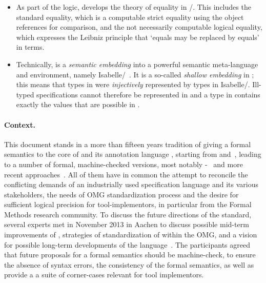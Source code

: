\begin{itemize}
 \item As part of the \OCL logic,  \FOCL develops the theory of
         equality in \UML/\OCL. This includes the standard equality, which is a
         computable strict equality using the object references for comparison,
         and the not necessarily computable logical equality, which expresses
         the Leibniz principle that `equals may be replaced by equals' in 
         \OCL terms.
 \item Technically,  \FOCL is a \emph{semantic embedding} into a 
         powerful semantic meta-language and
         environment, namely Isabelle/\HOL~\cite{nipkow.ea:isabelle:2002}.
         It is a so-called \emph{shallow embedding} in \HOL; this means that types
         in \OCL were \emph{injectively} represented by types in Isabelle/\HOL. 
         Ill-typed \OCL specifications cannot therefore be represented in
          \FOCL and a type in  \FOCL contains exactly
         the values that are possible in \OCL\@. 
\end{itemize}

\paragraph{Context.} This document stands in a more than fifteen years
tradition of giving a formal semantics to the core of \UML and its
annotation language \OCL, starting from \citet{richters:precise:2002}
and~\cite{hamie.ea:reflections:1998,mandel.ea:ocl:1999,cook.ea::amsterdam:2002},
leading to a number of formal, machine-checked versions, most notably
\HOL-\OCL~\cite{brucker.ea:semantic:2006-b,brucker:interactive:2007,brucker.ea:hol-ocl-book:2006,brucker.ea:extensible:2008-b}
and more recent approaches~\cite{DBLP:conf/models/BruckerLTW13}. All
of them have in common the attempt to reconcile the conflicting
demands of an industrially used specification language and its various
stakeholders, the needs of OMG standardization process and the desire
for sufficient logical precision for tool-implementors, in particular
from the Formal Methods research community.  To discuss the future
directions of the standard, several \OCL experts met in November 2013
in Aachen to discuss possible mid-term improvements of \OCL,
strategies of standardization of \OCL within the OMG, and a vision for
possible long-term developments of the
language~\cite{brucker.ea:summary-aachen:2013}. The participants
agreed that future proposals for a formal semantics should be
machine-check, to ensure the absence of syntax errors, the consistency
of the formal semantics, as well as provide a a suite of corner-cases
relevant for \OCL tool implementors.

